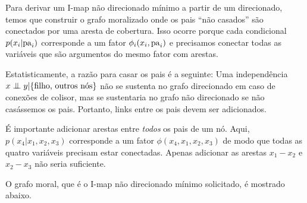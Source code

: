 \begin{solution}
    
    Para derivar um I-map n\~ao direcionado m\'inimo a partir de um direcionado, temos que construir o grafo moralizado onde os pais ``n\~ao casados'' s\~ao conectados por uma aresta de cobertura. Isso ocorre porque cada condicional $p(x_i | \mathrm{pa}_i)$ corresponde a um fator $\phi_i(x_i,\mathrm{pa}_i)$ e precisamos conectar todas as vari\'aveis que s\~ao argumentos do mesmo fator com arestas.
    
    Estatisticamente, a raz\~ao para casar os pais \'e a seguinte: Uma independ\^encia $x \mathrel{\perp\mspace{-10mu}\perp} y | \{\text{filho, outros n\'os}\}$ n\~ao se sustenta no grafo direcionado em caso de conex\~oes de colisor, mas se sustentaria no grafo n\~ao direcionado se n\~ao cas\'assemos os pais. Portanto, links entre os pais devem ser adicionados.
    
    \'E importante adicionar arestas entre \emph{todos} os pais de um n\'o. Aqui, $p(x_4 | x_1, x_2, x_3)$ corresponde a um fator $\phi(x_4, x_1, x_2, x_3)$ de modo que todas as quatro vari\'aveis precisam estar conectadas. Apenas adicionar as arestas $x_1 - x_2$ e $x_2 - x_3$ n\~ao seria suficiente.
    
    O grafo moral, que \'e o I-map n\~ao direcionado m\'inimo solicitado, \'e mostrado abaixo.
    
    \begin{center}
    \end{center}
    
\end{solution}

